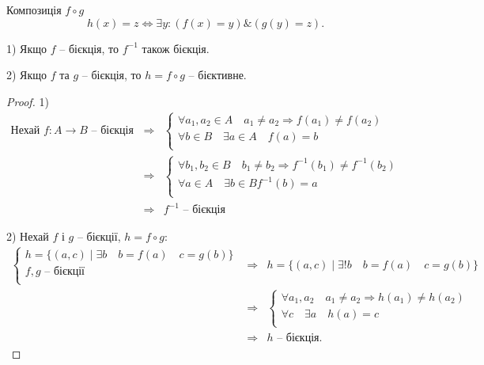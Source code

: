 \begin{definition}[Композиція]
    Композиція $f \circ g$
    $$h(x) = z \Leftrightarrow \exists y: (f(x) = y) \& (g(y) = z).$$
\end{definition}

\begin{theorem}
    1) Якщо $f$ -- бієкція, то $f^{-1}$ також бієкція.
    
    2) Якщо $f$ та $g$ -- бієкція, то $h = f \circ g$ -- бієктивне.
\end{theorem}
\begin{proof}
    1) $$\begin{array}{rcl}
        \text{Нехай } f: A \rightarrow B \text{ -- бієкція }
        & \Rightarrow & \left\{ \begin{array}{l}
            \forall a_1, a_2 \in A \quad a_1 \neq a_2 \Rightarrow f(a_1) \neq f(a_2)  \\
            \forall b \in B \quad \exists a \in A \quad f(a) = b  \\
        \end{array} \right. \\
        & \Rightarrow & \left\{ \begin{array}{l}
            \forall b_1, b_2 \in B \quad b_1 \neq b_2 \Rightarrow f^{-1}(b_1) \neq f^{-1}(b_2) \\
            \forall a \in A \quad \exists b \in B f^{-1}(b) = a \\
        \end{array} \right. \\
         & \Rightarrow & f^{-1} \text{ -- бієкція}
    \end{array}$$

    2) Нехай $f$ і $g$ -- бієкції, $h = f \circ g$:
    $$\begin{array}{rcl}
         \left\{ \begin{array}{l}
             h = \{ (a, c) \mid \exists b \quad b = f(a) \quad c = g(b) \}  \\
             f, g \text{ -- бієкції}  \\
         \end{array} \right.
         & \Rightarrow & h = \{ (a, c) \mid \exists! b \quad b = f(a) \quad c = g(b) \}  \\
         & \Rightarrow & \left\{ \begin{array}{l}
            \forall a_1, a_2 \quad a_1 \neq a_2 \Rightarrow h(a_1) \neq h(a_2) \\
            \forall c \quad \exists a \quad h(a) = c \\
        \end{array} \right.  \\
        & \Rightarrow & h \text{ -- бієкція}.
    \end{array}$$
\end{proof}

